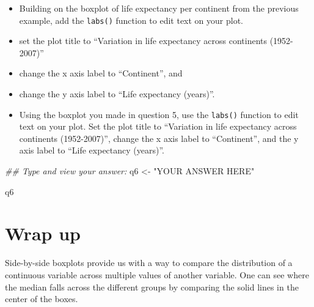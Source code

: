 \documentclass[
  letterpaper,
  DIV=11,
  numbers=noendperiod]{scrreprt}
\newenvironment{Shaded}{\begin{snugshade}}{\end{snugshade}}
\newcommand{\DocumentationTok}[1]{\textcolor[rgb]{0.37,0.37,0.37}{\textit{#1}}}
\newcommand{\NormalTok}[1]{\textcolor[rgb]{0.00,0.23,0.31}{#1}}
\newcommand{\OtherTok}[1]{\textcolor[rgb]{0.00,0.23,0.31}{#1}}
\newcommand{\StringTok}[1]{\textcolor[rgb]{0.13,0.47,0.30}{#1}}
\providecommand{\tightlist}{%
  \setlength{\itemsep}{0pt}\setlength{\parskip}{0pt}}\usepackage{longtable,booktabs,array}
\begin{document}
\begin{tcolorbox}[enhanced jigsaw, colframe=quarto-callout-note-color-frame, colbacktitle=quarto-callout-note-color!10!white, titlerule=0mm, opacitybacktitle=0.6, breakable, toprule=.15mm, arc=.35mm, rightrule=.15mm, colback=white, bottomrule=.15mm, opacityback=0, toptitle=1mm, left=2mm, bottomtitle=1mm, title=\textcolor{quarto-callout-note-color}{\faInfo}\hspace{0.5em}{Challenge}, leftrule=.75mm, coltitle=black]

\begin{itemize}
\tightlist
\item
  Building on the boxplot of life expectancy per continent from the
  previous example, add the \texttt{labs()} function to edit text on
  your plot.
\item
  set the plot title to ``Variation in life expectancy across continents
  (1952-2007)''
\item
  change the x axis label to ``Continent'', and
\item
  change the y axis label to ``Life expectancy (years)''.
\item
  Using the boxplot you made in question 5, use the \texttt{labs()}
  function to edit text on your plot. Set the plot title to ``Variation
  in life expectancy across continents (1952-2007)'', change the x axis
  label to ``Continent'', and the y axis label to ``Life expectancy
  (years)''.
\end{itemize}

\begin{Shaded}
\begin{Highlighting}[]
\DocumentationTok{\#\# Type and view your answer:}
\NormalTok{q6 }\OtherTok{\textless{}{-}} \StringTok{"YOUR ANSWER HERE"} 
  
\NormalTok{q6}
\end{Highlighting}
\end{Shaded}

\end{tcolorbox}

\hypertarget{wrap-up-1}{%
\section{Wrap up}\label{wrap-up-1}}

Side-by-side boxplots provide us with a way to compare the distribution
of a continuous variable across multiple values of another variable. One
can see where the median falls across the different groups by comparing
the solid lines in the center of the boxes.
\end{document}
